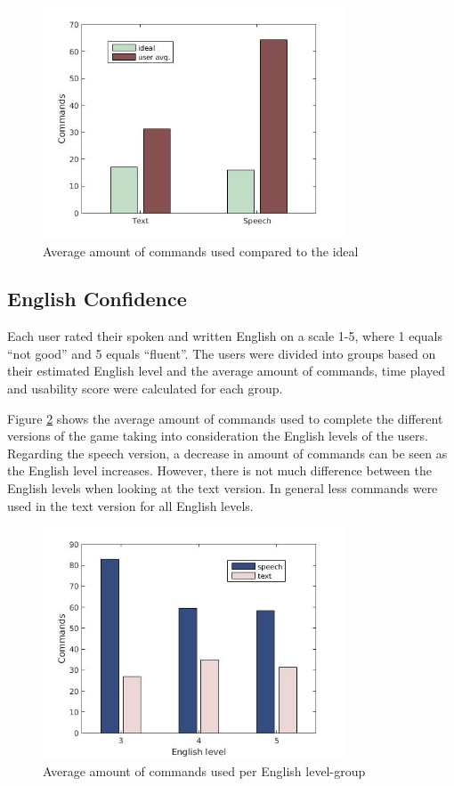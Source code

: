 \begin{figure}[ht]
  \centering
  \includegraphics[width=0.8\textwidth]{images/ideal_cmd.jpg}
  \caption{Average amount of commands used compared to the ideal}\label{ideal_cmd}
\end{figure}

\subsection{English Confidence} \label{sec:eng_con}
Each user rated their spoken and written English on a scale 1-5, where 1 equals ``not good'' and 5 equals ``fluent''. The users were divided into groups based on their estimated English level and the average amount of commands, time played and usability score were calculated for each group.

Figure \ref{eng_cmd} shows the average amount of commands used to complete the different versions of the game taking into consideration the English levels of the users. Regarding the speech version, a decrease in amount of commands can be seen as the English level increases. However, there is not much difference between the English levels when looking at the text version. In general less commands were used in the text version for all English levels.

\begin{figure}[ht]
  \centering
  \includegraphics[width=0.8\textwidth]{images/english_cmd.jpg}
  \caption{Average amount of commands used per English level-group}\label{eng_cmd}
\end{figure}

